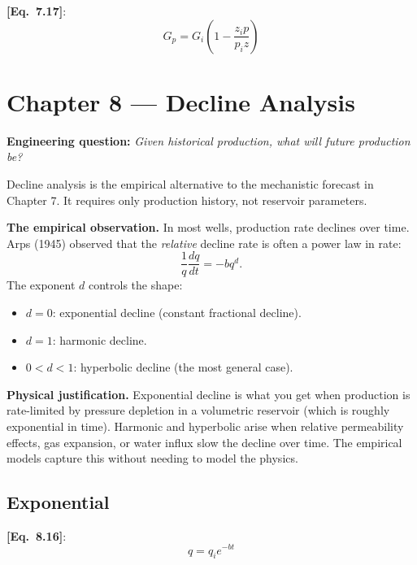 \documentclass[11pt,a4paper,openany]{book}
\newcommand{\eqrefbook}[1]{\textcolor{blue!60!black}{\textbf{[Eq.~#1]}}}
\begin{document}
\eqrefbook{7.17}:
\begin{equation}
  G_p = G_i\left(1 - \frac{z_i p}{p_i z}\right)
\end{equation}

\chapter{Chapter 8 — Decline Analysis}

\begin{purpose}
\textbf{Engineering question:} \emph{Given historical production, what
will future production be?}

Decline analysis is the empirical alternative to the mechanistic
forecast in Chapter 7. It requires only production history, not
reservoir parameters.
\end{purpose}

\begin{theory}
\textbf{The empirical observation.} In most wells, production rate
declines over time. Arps (1945) observed that the \emph{relative}
decline rate is often a power law in rate:
\[
  \frac{1}{q}\frac{dq}{dt} = -b q^d.
\]
The exponent $d$ controls the shape:
\begin{itemize}
  \item $d = 0$: exponential decline (constant fractional decline).
  \item $d = 1$: harmonic decline.
  \item $0 < d < 1$: hyperbolic decline (the most general case).
\end{itemize}

\textbf{Physical justification.} Exponential decline is what you get
when production is rate-limited by pressure depletion in a
volumetric reservoir (which is roughly exponential in time). Harmonic
and hyperbolic arise when relative permeability effects, gas
expansion, or water influx slow the decline over time. The empirical
models capture this without needing to model the physics.
\end{theory}

\section{Exponential}

\eqrefbook{8.16}:
\begin{equation}
  q = q_i e^{-bt}
\end{equation}
\end{document}
